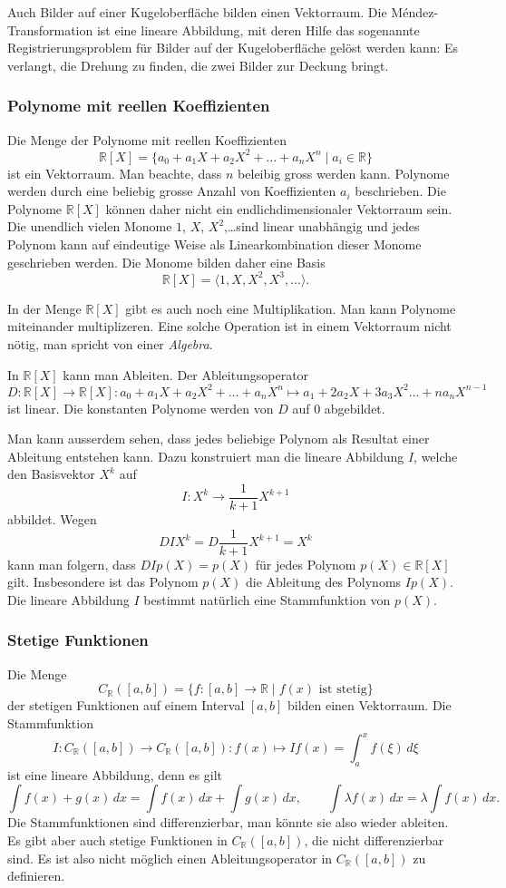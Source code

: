 Auch Bilder auf einer Kugeloberfläche bilden einen Vektorraum.
Die Méndez-Transformation ist eine lineare Abbildung, mit deren Hilfe
das sogenannte Registrierungsproblem für Bilder auf der Kugeloberfläche
gelöst werden kann: Es verlangt, die Drehung zu finden, die zwei Bilder
zur Deckung bringt.

\subsubsection{Polynome mit reellen Koeffizienten}
Die Menge der Polynome mit reellen Koeffizienten
\[
\mathbb R[X]
=
\{
a_0 + a_1X + a_2X^2 + \dots + a_nX^n
\;|\;
a_i\in\mathbb R
\}
\]
ist ein Vektorraum.
Man beachte, dass $n$ beleibig gross werden kann.
Polynome werden durch
eine beliebig grosse Anzahl von Koeffizienten $a_i$ beschrieben.
Die Polynome $\mathbb R[X]$ können daher nicht ein endlichdimensionaler
Vektorraum sein.
Die unendlich vielen Monome $1$, $X$, $X^2$,\dots sind linear unabhängig
und jedes Polynom kann auf eindeutige Weise als Linearkombination dieser
Monome geschrieben werden.
Die Monome bilden daher eine Basis
\[
\mathbb R[X] = \langle 1,X,X^2,X^3,\dots\rangle.
\]

In der Menge $\mathbb R[X]$ gibt es auch noch eine Multiplikation.
Man kann Polynome miteinander multiplizeren.
Eine solche Operation ist in einem Vektorraum nicht nötig, man spricht
von einer {\em Algebra}.
%

In $\mathbb R[X]$ kann man Ableiten.
Der Ableitungsoperator
\[
D\colon \mathbb R[X] \to \mathbb R[X]:
a_0+a_1X+a_2X^2+\dots +a_nX^n
\mapsto
a_1+2a_2X+3a_3X^2\dots +na_nX^{n-1}
\]
ist linear.
Die konstanten Polynome werden von $D$ auf $0$ abgebildet.

Man kann ausserdem sehen, dass jedes beliebige Polynom als Resultat
einer Ableitung entstehen kann.
Dazu konstruiert man die lineare Abbildung $I$, welche den Basisvektor
$X^k$ auf
\[
I\colon X^k \to \frac{1}{k+1} X^{k+1}
\]
abbildet.
Wegen
\[
DIX^k = D\frac{1}{k+1}X^{k+1}=X^k
\]
kann man folgern, dass $DIp(X)=p(X)$ für jedes Polynom
$p(X)\in\mathbb R[X]$ gilt.
Insbesondere ist das Polynom $p(X)$ die Ableitung des Polynoms $Ip(X)$.
Die lineare Abbildung $I$ bestimmt natürlich eine Stammfunktion von $p(X)$.


\subsubsection{Stetige Funktionen}
Die Menge
\[
C_{\mathbb R}([a,b]) = \{f:[a,b]\to\mathbb R\;|\; \text{$f(x)$ ist stetig}\}
\]
der stetigen Funktionen auf einem Interval $[a,b]$ bilden einen
Vektorraum.
Die Stammfunktion
\[
I
\colon
C_{\mathbb R}([a,b]) \to C_{\mathbb R}([a,b])
:
f(x) \mapsto If(x) = \int_a^x f(\xi)\,d\xi
\]
ist eine lineare Abbildung, denn es gilt
\[
\int f(x)+g(x)\,dx = \int f(x)\,dx + \int g(x)\,dx,
\qquad
\int \lambda f(x)\,dx = \lambda\int f(x)\,dx.
\]
Die Stammfunktionen sind differenzierbar, man könnte sie also wieder ableiten.
Es gibt aber auch stetige Funktionen in $C_{\mathbb R}([a,b])$, die nicht
differenzierbar sind.
Es ist also nicht möglich einen Ableitungsoperator in $C_{\mathbb R}([a,b])$
zu definieren.

